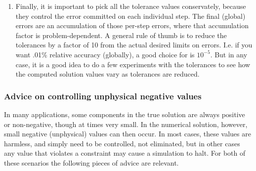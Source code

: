 \documentclass[letterpaper,10pt,english]{sphinxmanual}
\begin{document}
\begin{enumerate}
\item {} 
Finally, it is important to pick all the tolerance values
conservately, because they control the error committed on each
individual step. The final (global) errors are an accumulation of
those per-step errors, where that accumulation factor is
problem-dependent.  A general rule of thumb is to reduce the
tolerances by a factor of 10 from the actual desired limits on
errors.  I.e. if you want .01\% relative accuracy (globally), a good
choice for  is \(10^{-5}\).  But in any case, it is
a good idea to do a few experiments with the tolerances to see how
the computed solution values vary as tolerances are reduced.

\end{enumerate}


\subsubsection{Advice on controlling unphysical negative values}
\label{c_interface/User_callable:advice-on-controlling-unphysical-negative-values}
In many applications, some components in the true solution are always
positive or non-negative, though at times very small.  In the
numerical solution, however, small negative (unphysical) values
can then occur. In most cases, these values are harmless, and simply
need to be controlled, not eliminated, but in other cases any value
that violates a constraint may cause a simulation to halt. For both of
these scenarios the following pieces of advice are relevant.
\end{document}
